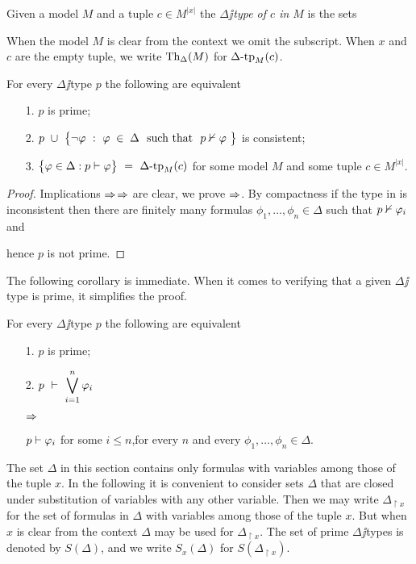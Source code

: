 \documentclass[creche.tex]{subfiles}
\begin{document}
Given a model $M$ and a tuple $c\in M^{|x|}$ the \emph{$\Delta\jj$type of $c$ in $M$\/} is the sets


When the model $M$ is clear from the context we omit the subscript. When $x$ and $c$ are the empty tuple, we write \emph{$\textrm{Th}_\Delta(M)$} for $\Delta\mbox{-}\textrm{tp}_M(c)$.

\begin{lemma}\label{lemmatipiprimiconsistenti}
For every $\Delta\jj$type $p$ the following are equivalent
\begin{itemize}
\item[1.] $p$ is prime;
\item[2.] $p\ \cup\ \big\{\neg\phi\ :\  \phi\;\in\;\Delta\ \ \textrm{such that}\ \ p\notproves\phi\ \big\}$ is consistent;
\item[3.] $\big\{\phi\in\Delta : p\proves\phi\big\}\ = \ \Deltatp_M(c)$ for some model $M$ and some tuple $c\in M^{|x|}$.
\end{itemize}
\end{lemma}
\begin{proof}
Implications $\Rightarrow$$\Rightarrow$ are clear, we prove $\Rightarrow$. By compactness if the type in  is inconsistent then there are finitely many formulas $\phi_1,\dots,\phi_n\in\Delta$ such that $p\nvdash\varphi_i$ and


hence $p$ is not prime.
\end{proof}

The following corollary is immediate. When it comes to verifying that a given $\Delta\jj$type is prime, it simplifies the proof.

\begin{corollary}\label{coroll_test_primalita}
For every $\Delta\jj$type $p$ the following are equivalent
\begin{itemize}
\item[1.] $p$ is prime;
\item[2.] $\displaystyle p\ \proves\ \bigvee^n_{i=1}\phi_i$\parbox{6ex}{\hfil$\Rightarrow$}$p\vdash\varphi_i$ for some $i\le n$,\hfill for every $n$ and every $\phi_1,\dots,\phi_n\in\Delta$.\QED
\end{itemize}
\end{corollary}

The set $\Delta$ in this section contains only formulas with variables among those of the tuple $x$. In the following it is convenient to consider sets $\Delta$ that are closed under substitution of variables with any other variable. Then we may write \emph{$\Delta_{\restriction x}$} for the set of formulas in $\Delta$ with variables among those of the tuple $x$. But when $x$ is clear from the context $\Delta$ may be used for $\Delta_{\restriction x}$. The set of prime $\Delta\jj$types is denoted by \emph{$S(\Delta)$}, and we write \emph{$S_x(\Delta)$\/} for $S(\Delta_{\restriction x})$.
\end{document}

